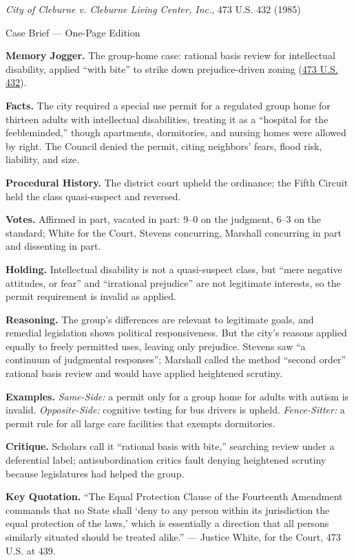 \documentclass[12pt]{article}
\begin{document}
\begin{center}
{\Large \textit{City of Cleburne v. Cleburne Living Center, Inc.}, 473 U.S. 432 (1985)\par}
\vspace{0.3em}
{\normalsize Case Brief --- One-Page Edition\par}
\end{center}

\textbf{Memory Jogger.} The group-home case: rational basis review for intellectual disability, applied ``with bite'' to strike down prejudice-driven zoning (\href{https://supreme.justia.com/cases/federal/us/473/432/}{473 U.S. 432}).

\textbf{Facts.} The city required a special use permit for a regulated group home for thirteen adults with intellectual disabilities, treating it as a ``hospital for the feebleminded,'' though apartments, dormitories, and nursing homes were allowed by right. The Council denied the permit, citing neighbors' fears, flood risk, liability, and size.

\textbf{Procedural History.} The district court upheld the ordinance; the Fifth Circuit held the class quasi-suspect and reversed.

\textbf{Votes.} Affirmed in part, vacated in part: 9--0 on the judgment, 6--3 on the standard; White for the Court, Stevens concurring, Marshall concurring in part and dissenting in part.

\textbf{Holding.} Intellectual disability is not a quasi-suspect class, but ``mere negative attitudes, or fear'' and ``irrational prejudice'' are not legitimate interests, so the permit requirement is invalid as applied.

\textbf{Reasoning.} The group's differences are relevant to legitimate goals, and remedial legislation shows political responsiveness. But the city's reasons applied equally to freely permitted uses, leaving only prejudice. Stevens saw ``a continuum of judgmental responses''; Marshall called the method ``second order'' rational basis review and would have applied heightened scrutiny.

\textbf{Examples.} \emph{Same-Side:} a permit only for a group home for adults with autism is invalid. \emph{Opposite-Side:} cognitive testing for bus drivers is upheld. \emph{Fence-Sitter:} a permit rule for all large care facilities that exempts dormitories.

\textbf{Critique.} Scholars call it ``rational basis with bite,'' searching review under a deferential label; antisubordination critics fault denying heightened scrutiny because legislatures had helped the group.

\textbf{Key Quotation.} ``The Equal Protection Clause of the Fourteenth Amendment commands that no State shall `deny to any person within its jurisdiction the equal protection of the laws,' which is essentially a direction that all persons similarly situated should be treated alike.'' --- Justice White, for the Court, 473 U.S. at 439.
\end{document}
